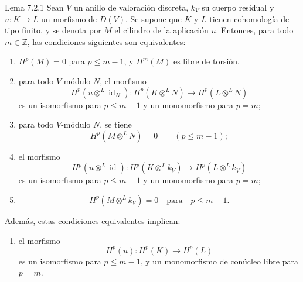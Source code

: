 \begin{statement}{Lema 7.2.1}
Sean $V$ un anillo de valoración discreta, $k_V$ su cuerpo residual y $u:K\to L$ un morfismo de $D(V)$. Se supone que $K$ y $L$ tienen cohomología de tipo finito, y se denota por $M$ el cilindro de la aplicación $u$. Entonces, para todo $m\in\mathbb Z$, las condiciones siguientes son equivalentes:
\begin{enumerate}[label=(\roman*)]
\item $H^p(M)=0$ para $p\le m-1$, y $H^m(M)$ es libre de torsión.
\item para todo $V$-módulo $N$, el morfismo
\[
H^p(u\otimes^L\operatorname{id}_N):H^p(K\otimes^L N)\to H^p(L\otimes^L N)
\]
es un isomorfismo para $p\le m-1$ y un monomorfismo para $p=m$;
\item[(ii bis)] para todo $V$-módulo $N$, se tiene
\[
H^p(M\otimes^L N)=0\qquad(p\le m-1);
\]
\item el morfismo
\[
H^p(u\otimes^L\operatorname{id}):H^p(K\otimes^L k_V)\to H^p(L\otimes^L k_V)
\]
es un isomorfismo para $p\le m-1$ y un monomorfismo para $p=m$;
\item[(iii bis)]
\[
H^p(M\otimes^L k_V)=0\quad\text{para}\quad p\le m-1.
\]
\end{enumerate}
Además, estas condiciones equivalentes implican:
\begin{enumerate}[label=(\roman* bis)]
\item el morfismo
\[
H^p(u):H^p(K)\to H^p(L)
\]
es un isomorfismo para $p\le m-1$, y un monomorfismo de conúcleo libre para $p=m$.
\end{enumerate}
\end{statement}
